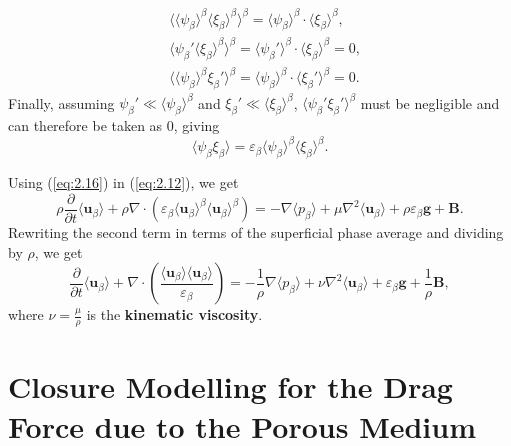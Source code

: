 \documentclass[a4paper, 11pt]{report}
\begin{document}
\begin{align*}
	&\langle\langle\psi_\beta\rangle^\beta\langle\xi_\beta\rangle^\beta\rangle^\beta = \langle\psi_\beta\rangle^\beta\cdot\langle\xi_\beta\rangle^\beta, \\
    &\langle\psi_\beta'\langle\xi_\beta\rangle^\beta\rangle^\beta = \langle\psi_\beta'\rangle^\beta\cdot\langle\xi_\beta\rangle^\beta = 0, \\
    &\langle\langle\psi_\beta\rangle^\beta\xi_\beta'\rangle^\beta = \langle\psi_\beta\rangle^\beta\cdot\langle\xi_\beta'\rangle^\beta = 0.
\end{align*}
Finally, assuming $\psi_\beta' \ll \langle\psi_\beta\rangle^\beta$ and $\xi_\beta' \ll \langle\xi_\beta\rangle^\beta$, $\langle\psi_\beta'\xi_\beta'\rangle^\beta$ must be negligible and can therefore be taken as 0, giving
\begin{equation}
	\boxed{\langle\psi_\beta\xi_\beta\rangle = \varepsilon_\beta\langle\psi_\beta\rangle^\beta\langle\xi_\beta\rangle^\beta.} \label{eq:2.16}
\end{equation}

Using (\ref{eq:2.16}) in (\ref{eq:2.12}), we get
\begin{equation}
    \rho\frac{\partial}{\partial t}\langle\mathbf{u}_{\beta}\rangle + \rho\nabla\cdot(\varepsilon_\beta\langle\mathbf{u}_{\beta}\rangle^\beta\langle\mathbf{u}_{\beta}\rangle^\beta) = -\nabla\langle p_{\beta}\rangle + \mu\nabla^2\langle\mathbf{u}_{\beta}\rangle + \rho\varepsilon_\beta\mathbf{g} + \mathbf{B}. \label{eq:2.17}
\end{equation}
Rewriting the second term in terms of the superficial phase average and dividing by $\rho$, we get
\begin{equation}
    \boxed{\frac{\partial}{\partial t}\langle\mathbf{u}_{\beta}\rangle + \nabla\cdot\left(\frac{\langle\mathbf{u}_{\beta}\rangle\langle\mathbf{u}_{\beta}\rangle}{\varepsilon_\beta}\right) = -\frac{1}{\rho}\nabla\langle p_{\beta}\rangle + \nu\nabla^2\langle\mathbf{u}_{\beta}\rangle + \varepsilon_\beta\mathbf{g} + \frac{1}{\rho}\mathbf{B},} \label{eq:2.18}
\end{equation}
where $\nu = \frac{\mu}{\rho}$ is the \textbf{kinematic viscosity}.


\section{Closure Modelling for the Drag Force due to the Porous Medium} \label{sec:2.5}
\end{document}
